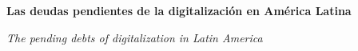 \documentclass{article}
\renewcommand{\normalsize}{\fontsize{10pt}{13pt}\selectfont}
\newcommand{\articulotipo}{}
\newcommand{\articulotitulo}{}
\newcommand{\articulotitulotrans}{}
\newcommand{\articuloautores}{}
\newcommand{\articulodoi}{}
\newcommand{\articuloidiomaxml}{es}
\newcommand{\articulorevista}{}
\newcommand{\articuloissne}{}
\newcommand{\articulovolumen}{}
\newcommand{\articulonumero}{}
\newcommand{\articulofecha}{}
\newcommand{\articulopagina}{0}
\begin{document}

\renewcommand{\articuloidiomaxml}{es}
\renewcommand{\articulotitulo}{Las deudas pendientes de la digitalización en América Latina}
\renewcommand{\articuloautores}{Lucas Samyn, Ruth Alonso Cabral}
\renewcommand{\articulodoi}{10.18356/9789210029582c005}
\renewcommand{\articulotipo}{EDITORIAL}
\renewcommand{\articulorevista}{Blensera}
\renewcommand{\articuloissne}{2697-3650}
\renewcommand{\articulovolumen}{01}
\renewcommand{\articulonumero}{01}
\renewcommand{\articulofecha}{ 2026}
\renewcommand{\articulopagina}{1}

\setcounter{page}{1}
\thispagestyle{firstpage}

\noindent\begin{minipage}[t]{\dimexpr\textwidth+\marginparsep+\marginparwidth\relax}%
{\sffamily\bfseries\Large\articulotitulo\par}%
\end{minipage}\par
\vspace{3mm}%
\renewcommand{\articulotitulotrans}{The pending debts of digitalization in Latin America}
\noindent\begin{minipage}[t]{\dimexpr\textwidth+\marginparsep+\marginparwidth\relax}%
{\sffamily\itshape\normalsize\articulotitulotrans\par}%
\end{minipage}\par
\vspace{4mm}%
\end{document}
